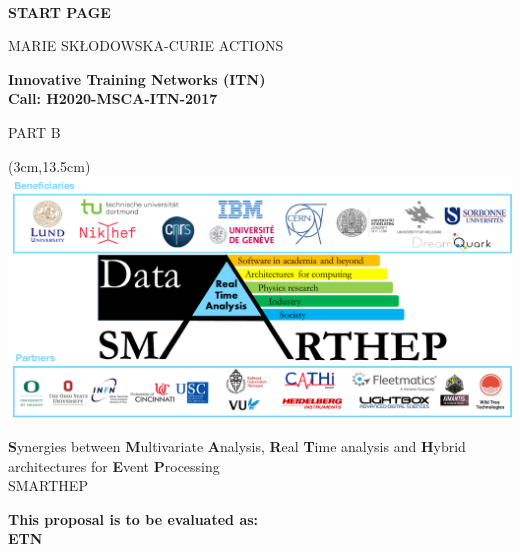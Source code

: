 \documentclass[11pt,a4paper]{article}
\def\acronym{SMARTHEP\xspace}
\begin{document}
\begin{center}

\mbox{ }\\[1ex
\vspace{1cm}]

{\LARGE\bf START PAGE}

\vspace{2.5cm}


{\LARGE MARIE SK\L ODOWSKA-CURIE ACTIONS}\\[2ex]

\vspace{2cm}

{\LARGE\bf Innovative Training Networks (ITN)\\
Call: H2020-MSCA-ITN-2017}\\[2ex]

\vspace{1.0cm}

{\LARGE PART B}

\begin{textblock*}{15cm}(3cm,13.5cm)
	\centering 
	\includegraphics[width=1.0\textwidth]{figs/NetworkComposition}
\end{textblock*}    

\vspace{9.0cm}


{\LARGE {\color{blue}\textbf{S}}ynergies between {\color{blue}\textbf{M}}ultivariate {\color{blue}\textbf{A}}nalysis, 
 {\color{blue}\textbf{R}}eal {\color{blue}\textbf{T}}ime analysis and {\color{blue}\textbf{H}}ybrid architectures 
 for {\color{blue}\textbf{E}}vent {\color{blue}\textbf{P}}rocessing \\ SMARTHEP}

\vspace{1.0cm}


{\large\bf This proposal is to be evaluated as:}\\
{\large\bf ETN}

\vspace{1.0cm}

\end{center}
\end{document}
